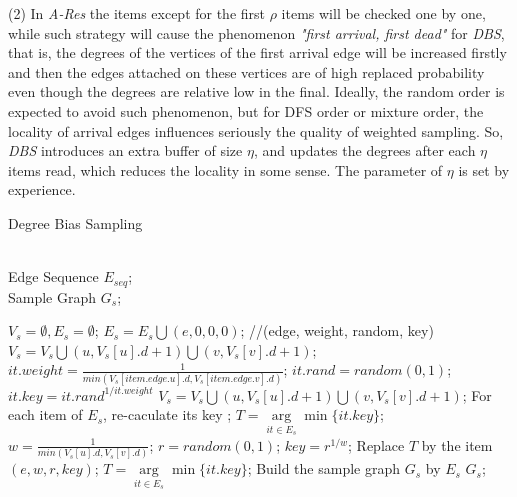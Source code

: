 \documentclass{sig-alternate-2013}
\begin{document}
(2)  In \textit{A-Res} the items except for the first $\rho$ items will be checked one by one, while such strategy will cause the phenomenon \textit{"first arrival, first dead"} for \textit{DBS}, that is,  the degrees of the vertices of the first arrival edge will be increased firstly and then the edges attached on these vertices are of high replaced probability even though the degrees are relative low in the final. Ideally, the random order is expected to avoid such phenomenon, but for DFS order or mixture order, the locality of arrival edges influences seriously the quality of weighted sampling. So, \textit{DBS} introduces an extra buffer of size $\eta$, and updates the degrees after each $\eta$ items read, which reduces the locality in some sense. The parameter of $\eta$ is set by experience. %

\begin{algorithm}[h]
\renewcommand{\algorithmicrequire}{\textbf{Input:}}
\renewcommand\algorithmicensure {\textbf{Output:} }
\caption{Degree Bias Sampling}
\label{alg:degree-bias-sampling}
\begin{algorithmic}[1]
\REQUIRE ~~\\ %
Edge Sequence $E_{seq}$;
\ENSURE ~~\\ %
Sample Graph $G_s$;

\STATE $V_s=\emptyset,E_s=\emptyset$;
  \STATE $E_s=E_s \bigcup (e, 0,0,0)$; //(edge, weight, random, key)
  \STATE $V_s=V_s \bigcup (u, V_s[u].d+1)\bigcup (v, V_s[v].d+1)$;
\ENDFOR
{}
 \STATE $it.weight = \frac{1}{min(V_s[item.edge.u].d,V_s[item.edge.v].d)}$;
 \STATE $it.rand = random(0,1)$;
 \STATE $it.key = it.rand^{1/it.weight}$
\ENDFOR
\REPEAT
    \STATE $V_s=V_s \bigcup (u, V_s[u].d+1)\bigcup (v, V_s[v].d+1)$;
  \ENDFOR
  \STATE For each item of $E_s$, re-caculate its key ;
  \STATE $T =\underset{it\in{E_s}} \arg \min \{ it.key\}$;
    \STATE $w =\frac{1}{min(V_s[u].d,V_s[v].d)}$;
    \STATE $r= random(0,1)$;
    \STATE $key = r^{1/w}$;
      \STATE Replace $T$ by the item $(e, w, r, key)$;
      \STATE $T =\underset{it\in{E_s}} \arg \min \{ it.key\}$;
   \ENDIF
  \ENDFOR
{}
\STATE Build the sample graph $G_s$ by $E_s$
\RETURN  $G_s$;
\end{algorithmic}
\end{algorithm}
\end{document}
